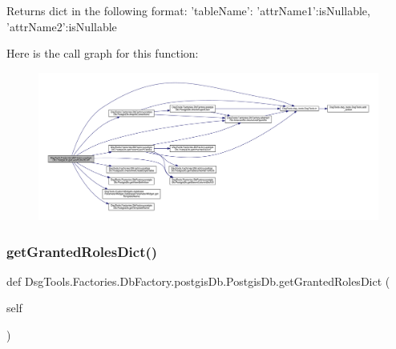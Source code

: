 \begin{DoxyVerb}Returns dict in the following format:
{'tableName': { 'attrName1':isNullable, 'attrName2':isNullable} }
\end{DoxyVerb}
 Here is the call graph for this function\+:
\nopagebreak
\begin{figure}[H]
\begin{center}
\leavevmode
\includegraphics[width=350pt]{class_dsg_tools_1_1_factories_1_1_db_factory_1_1postgis_db_1_1_postgis_db_ab6ab584551ee1175f693e3c1dddf4039_cgraph}
\end{center}
\end{figure}
\mbox{\label{class_dsg_tools_1_1_factories_1_1_db_factory_1_1postgis_db_1_1_postgis_db_acc7130a91fa8a1104c3f7d1c4e3fc2f3}} 
\subsubsection{\texorpdfstring{get\+Granted\+Roles\+Dict()}{getGrantedRolesDict()}}
{\footnotesize\ttfamily def Dsg\+Tools.\+Factories.\+Db\+Factory.\+postgis\+Db.\+Postgis\+Db.\+get\+Granted\+Roles\+Dict (\begin{DoxyParamCaption}\item[{}]{self }\end{DoxyParamCaption})}

